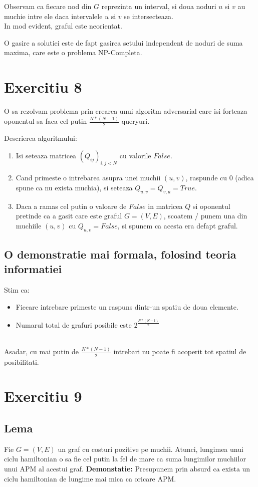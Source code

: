 \documentclass{article}
\begin{document}
Observam ca fiecare nod din $G$ reprezinta un interval, si doua noduri $u$ si $v$ au muchie intre ele daca intervalele $u$ si $v$ se intersecteaza.\\
In mod evident, graful este neorientat.

O gasire a solutiei este de fapt gasirea setului independent de noduri de suma maxima, care este o problema NP-Completa.

\section*{Exercitiu 8}

O sa rezolvam problema prin crearea unui algoritm adversarial care isi forteaza oponentul sa faca cel putin $\frac{N * (N - 1)}{2}$ queryuri.

Descrierea algoritmului:
\begin{enumerate}
    \item Isi seteaza matricea $(Q_{ij})_{i,j < N}$ cu valorile $False$.
    \item Cand primeste o intrebarea asupra unei muchii $(u, v)$, raspunde cu $0$ (adica spune ca nu exista muchia), si seteaza $Q_{u,v}=Q_{v,u}=True$.
    \item Daca a ramas cel putin o valoare de $False$ in matricea $Q$ si oponentul pretinde ca a gasit care este graful $G=(V, E)$, scoatem / punem una din muchiile $(u, v)$ cu $Q_{u,v} = False$, si spunem ca acesta era defapt graful.
\end{enumerate}

\subsection*{O demonstratie mai formala, folosind teoria informatiei}
Stim ca:
\begin{itemize}
    \item Fiecare intrebare primeste un raspuns dintr-un spatiu de doua elemente.
    \item Numarul total de grafuri posibile este $2^{\frac{N*(N-1)}{2}}$
\end{itemize}\\
Asadar, cu mai putin de $\frac{N*(N-1)}{2}$ intrebari nu poate fi acoperit tot spatiul de posibilitati.

\section*{Exercitiu 9}

\subsection*{Lema}
Fie $G = (V, E)$ un graf cu costuri pozitive pe muchii.
\newline
Atunci, lungimea unui ciclu hamiltonian o sa fie cel putin la fel de mare ca suma lungimilor muchiilor unui APM al acestui graf.
\newline
\textbf{Demonstatie:}
\newline
Presupunem prin absurd ca exista un ciclu hamiltonian de lungime mai mica ca oricare APM.
\end{document}
